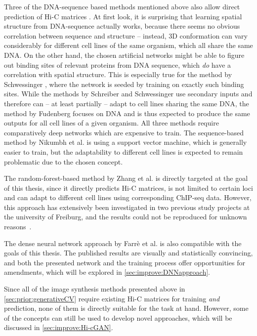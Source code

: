Three of the DNA-sequence based methods mentioned above also allow direct prediction of Hi-C matrices 
\cite{Schreiber2017, Fudenberg2020, Schwessinger2019}.
At first look, it is surprising that learning spatial structure from DNA-sequence actually works, 
because there seems no obvious correlation between sequence and structure -- 
instead, 3D conformation can vary considerably for different cell lines of the same organism, which all share the same DNA.
On the other hand, the chosen artificial networks might be able to figure out binding sites of relevant proteins from DNA sequence,
which \emph{do} have a correlation with spatial structure. 
This is especially true for the method by Schwessinger \cite{Schwessinger2019},
where the network is seeded by training on exactly such binding sites.
While the methods by Schreiber and Schwessinger use secondary inputs and therefore can -- at least partially -- 
adapt to cell lines sharing the same DNA, the method by Fudenberg focuses on DNA and is thus 
expected to produce the same outputs for all cell lines of a given organism.
All three methods require comparatively deep networks which are expensive to train.
The sequence-based method by Nikumbh et al. \cite{Nikumbh2017} is using a support vector machine, which is generally easier to train,
but the adaptability to different cell lines is expected to remain problematic due to the chosen concept.

The random-forest-based method by Zhang et al. \cite{Zhang2019} is directly targeted at the goal of this thesis,
since it directly predicts Hi-C matrices, is not limited to certain loci and can adapt to different cell lines using 
corresponding ChIP-seq data.
However, this approach has extensively been investigated in two previous study projects at the university of Freiburg,
and the results could not be reproduced for unknown reasons~\cite{Krauth2020,Bajorat2019}.

The dense neural network approach by Farr\`e et al. \cite{Farre2018a} is also compatible with the goals of this thesis.
The published results are visually and statistically convincing, and both the presented network and the training process offer
opportunities for amendments, which will be explored in \cref{sec:improve:DNNapproach}.

Since all of the image synthesis methods presented above in \cref{sec:prior:generativeCV} require existing Hi-C matrices 
for training \emph{and} prediction, none of them is directly suitable for the task at hand.
However, some of the concepts can still be used to develop novel approaches, which will be discussed in \cref{sec:improve:Hi-cGAN}.
